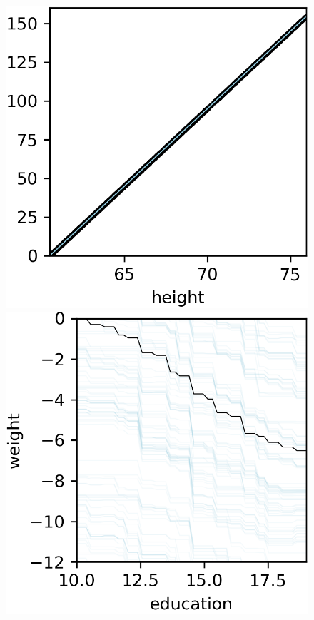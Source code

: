 \documentclass[12pt]{article}
\begin{document}
\begin{figure}[htbp]
\begin{center}
\includegraphics[scale=0.7]{images/height_vs_weight_stratpd.png}\\
\includegraphics[scale=0.7]{images/education_vs_weight_pdp.png}

\end{center}
\end{figure}
\end{document}
